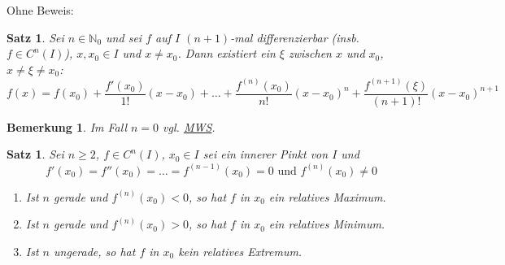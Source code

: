 \documentclass{extreport}
\newcommand{\N}{\mathbb{N}}
\theoremstyle{named}
\theoremstyle{dotless}
\newtheorem{satz}[namedtheorem]{Satz}
\newtheorem*{bemerkung}{Bemerkung}
\begin{document}
Ohne Beweis:

\begin{satz} \label{9.20:satz-Taylor}
	Sei $n \in \N_{0}$ und sei $f$ auf $I$ $(n+1)$-mal differenzierbar (insb. $f \in C^{n}(I)$), $x, x_{0} \in I$ und $x \neq x_{0}$. Dann existiert ein $\xi$ zwischen $x$ und $x_{0}$, $x \neq \xi \neq x_{0}$:
		$$ f(x) = f(x_{0}) + \frac{f'(x_{0})}{1!} (x - x_{0}) + \dotsc + \frac{f^{(n)}(x_{0})}{n!} (x - x_{0})^{n} + \frac{f^{(n+1)}(\xi)}{(n+1)!} (x - x_{0})^{n+1} $$
\end{satz}

\begin{bemerkung}
	Im Fall $n = 0$ vgl. \hyperref[9.7:prop-Mittelwertsatz]{MWS}.	
\end{bemerkung}


\begin{satz} \label{9.21:satz}
	Sei $n \geq 2$, $f \in C^{n}(I)$, $x_{0} \in I$ sei ein innerer Pinkt von $I$ und
	$$ f'(x_{0}) = f''(x_{0}) = \dotsc = f^{(n-1)}(x_{0}) = 0 \text{ und } f^{(n)}(x_{0}) \neq 0 $$
	\begin{enumerate}
		\item Ist $n$ gerade und $f^{(n)}(x_{0}) < 0$, so hat $f$ in $x_{0}$ ein relatives Maximum.
		\item Ist $n$ gerade und $f^{(n)}(x_{0}) > 0$, so hat $f$ in $x_{0}$ ein relatives Minimum.
		\item Ist $n$ ungerade, so hat $f$ in $x_{0}$ kein relatives Extremum. 
	\end{enumerate}	
\end{satz}
\end{document}
